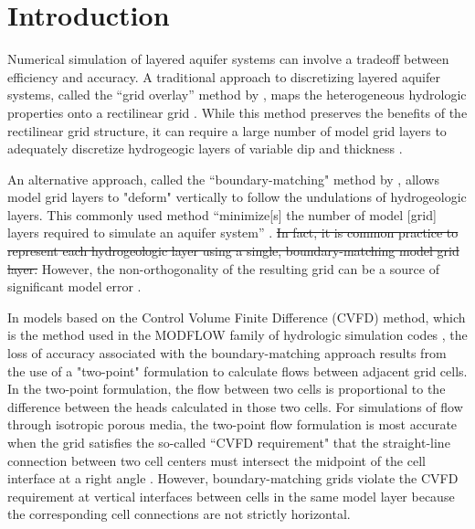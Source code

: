 \documentclass{article}
\begin{document}

\section*{Introduction}

Numerical simulation of layered aquifer systems can involve a tradeoff between efficiency and accuracy. A traditional approach to discretizing layered aquifer systems, called the ``grid overlay'' method by \cite{hoaglund2003}, maps the heterogeneous hydrologic properties onto a rectilinear grid \citep{modflow84}. While this method preserves the benefits of the rectilinear grid structure, it can require a large number of model grid layers to adequately discretize hydrogeogic layers of variable dip and thickness \citep{Zyvoloski2006}.

An alternative approach, called the ``boundary-matching" method by \cite{hoaglund2003}, allows model grid layers to "deform" vertically to follow the undulations of hydrogeologic layers. This {\color{red} commonly used} method ``minimize[s] the number of model [grid] layers required to simulate an aquifer system'' \citep{modflow84}. {\color{red} \sout{In fact, it is common practice to represent each hydrogeologic layer using a single, boundary-matching model grid layer. }}However, the non-orthogonality of the resulting grid can be a source of significant model error \citep{hoaglund2003}.

In models based on the Control Volume Finite Difference {\color{red} (CVFD)} method, which is the method used in the MODFLOW family of hydrologic simulation codes \citep{modflow6gwf, langevin2024}, the loss of accuracy associated with the boundary-matching approach results from the use of a "two-point" formulation to calculate flows between adjacent grid cells. In the two-point formulation, the flow between two cells is proportional to the difference between the heads calculated in those two cells. For simulations of flow through isotropic porous media, the two-point flow formulation is most accurate when the grid satisfies the so-called ``CVFD requirement" \citep{modflowusg, modflow6gwf} that the straight-line connection between two cell centers must intersect the midpoint of the cell interface at a right angle \citep{narasimhan1976integrated}. However, boundary-matching grids violate the CVFD requirement at vertical interfaces between cells in the same model layer because the corresponding cell connections are not strictly horizontal.
\end{document}
